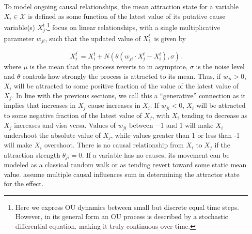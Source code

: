 \documentclass{cambridge7A}%
\begin{document}

To model ongoing causal relationships, the mean attraction state for a variable $X_i\in\mathcal{X}$ is defined as some function of the latest value of its putative cause variable(s) $X^t_j$.\footnote{Here we express OU dynamics between small but discrete equal time steps.  However, in its general form an OU process is described by a stochastic differential equation, making it truly continuous over time.}  \cite{davis2018ctcv} focus on linear relationships, with a single multiplicative parameter $w_{ji}$, such that the updated value of $X_i^{t^{\prime}}$ is given by

\begin{equation} \label{cont_OU_def}
X_i^{t^{\prime}} = X_i^{t} + N(\theta ( w_{ji} \cdot X_j^t - X_i^t),\sigma).
\end{equation}
where $\mu$ is the mean that the process reverts to in asymptote, $\sigma$ is the noise level and $\theta$ controls how strongly the process is attracted to its mean.  
Thus, if $w_{ji}>0$, $X_i$ will be attracted to some positive fraction of the value of the latest value of $X_j$.  In line with the previous sections, we call this a ``generative'' connection as it implies that increases in $X_j$ cause increases in $X_i$.  If $w_{ji}<0$, $X_i$ will be attracted to some negative fraction of the latest value of $X_j$, with $X_i$ tending to decrease as $X_j$ increases and visa versa.  Values of $w_{ji}$ between $-1$ and $1$ will make $X_i$ undershoot the absolute value of $X_j$, while values greater than 1 or less than -1 will make $X_i$ overshoot. There is no causal relationship from $X_i$ to $X_j$ if %
the attraction strength $\theta_{ji}=0$.  If a variable has no causes, its movement can be modeled as a classical random walk or as tending revert toward some static mean value.  %
\cite{davis2018ctcv} assume multiple causal influences sum in determining the attractor state for the effect. %
\end{document}
